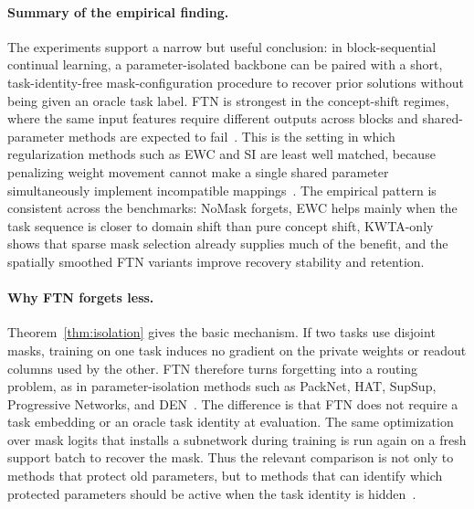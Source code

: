 \documentclass{article}
\begin{document}
\paragraph{Summary of the empirical finding.}
The experiments support a narrow but useful conclusion: in block-sequential continual learning, a parameter-isolated backbone can be paired with a short, task-identity-free mask-configuration procedure to recover prior solutions without being given an oracle task label. FTN is strongest in the concept-shift regimes, where the same input features require different outputs across blocks and shared-parameter methods are expected to fail~\citep{gama2014concept,morenotorres2012unifying,van2019three}. This is the setting in which regularization methods such as EWC and SI are least well matched, because penalizing weight movement cannot make a single shared parameter simultaneously implement incompatible mappings~\citep{kirkpatrick2017overcoming,zenke2017continual}. The empirical pattern is consistent across the benchmarks: NoMask forgets, EWC helps mainly when the task sequence is closer to domain shift than pure concept shift, KWTA-only shows that sparse mask selection already supplies much of the benefit, and the spatially smoothed FTN variants improve recovery stability and retention.

\paragraph{Why FTN forgets less.}
Theorem~\ref{thm:isolation} gives the basic mechanism. If two tasks use disjoint masks, training on one task induces no gradient on the private weights or readout columns used by the other. FTN therefore turns forgetting into a routing problem, as in parameter-isolation methods such as PackNet, HAT, SupSup, Progressive Networks, and DEN~\citep{mallya2018packnet,serra2018overcoming,wortsman2020supermasks,rusu2016progressive,yoon2018lifelong}. The difference is that FTN does not require a task embedding or an oracle task identity at evaluation. The same optimization over mask logits that installs a subnetwork during training is run again on a fresh support batch to recover the mask. Thus the relevant comparison is not only to methods that protect old parameters, but to methods that can identify which protected parameters should be active when the task identity is hidden~\citep{aljundi2019taskfree,van2019three}.
\end{document}
